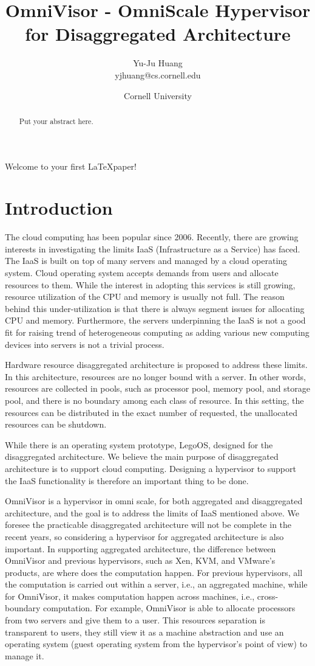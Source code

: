 \documentclass[twocolumn]{article}
\title{OmniVisor - OmniScale Hypervisor for Disaggregated Architecture}
\author{Yu-Ju Huang \\{yjhuang@cs.cornell.edu} }
\date{Cornell University}
\begin{document}
\maketitle

\begin{abstract}
Put your abstract here.
\end{abstract}

Welcome to your first \LaTeX paper!

\section{Introduction}

The cloud computing has been popular since 2006. Recently, there are growing interests in investigating the limits IaaS (Infrastructure as a Service) has faced. The IaaS is built on top of many servers and managed by a cloud operating system.  Cloud operating system accepts demands from users and allocate resources to them. While the interest in adopting this services is still growing, resource utilization of the CPU and memory is usually not full. The reason behind this under-utilization is that there is always segment issues for allocating CPU and memory. Furthermore, the servers underpinning the IaaS is not a good fit for raising trend of heterogeneous computing as adding various new computing devices into servers is not a trivial process. \par
    Hardware resource disaggregated architecture is proposed to address these limits. In this architecture, resources are no longer bound with a server. In other words, resources are collected in pools, such as processor pool, memory pool, and storage pool, and there is no boundary among each class of resource. In this setting, the resources can be distributed in the exact number of requested, the unallocated resources can be shutdown. \par
    While there is an operating system prototype, LegoOS, designed for the disaggregated architecture. We believe the main purpose of disaggregated architecture is to support cloud computing. Designing a hypervisor to support the IaaS functionality is therefore an important thing to be done. \par
    OmniVisor is a hypervisor in omni scale, for both aggregated and disaggregated architecture, and the goal is to address the limits of IaaS mentioned above. We foresee the practicable disaggregated architecture will not be complete in the recent years, so considering a hypervisor for aggregated architecture is also important. In supporting aggregated architecture, the difference between OmniVisor and previous hypervisors, such as Xen, KVM, and VMware’s products, are where does the computation happen. For previous hypervisors, all the computation is carried out within a server, i.e., an aggregated machine, while for OmniVisor, it makes computation happen across machines, i.e., cross-boundary computation. For example, OmniVisor is able to allocate processors from two servers and give them to a user. This resources separation is transparent to users, they still view it as a machine abstraction and use an operating system (guest operating system from the hypervisor’s point of view) to manage it. \par
\end{document}
